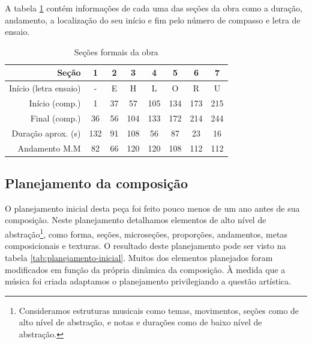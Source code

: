 A tabela \ref{tab:secoes-obra} contém informações de cada uma das
seções da obra como a duração, andamento, a localização do seu início
e fim pelo número de compasso e letra de ensaio.

\begin{table}
  \centering
  \begin{tabular}{r|ccccccc}
    Seção & 1 & 2 & 3 & 4 & 5 & 6 & 7 \\
    \hline
    Início (letra ensaio) & - & E & H & L & O & R & U \\
    Início (comp.) & 1 & 37 & 57 & 105 & 134 & 173 & 215 \\
    Final (comp.) & 36 & 56 & 104 & 133 & 172 & 214 & 244 \\
    Duração aprox. (s) & 132 & 91 & 108 & 56 & 87 & 23 & 16\\
    Andamento M.M & 82 & 66 & 120 & 120 & 108 & 112 & 112 \\
  \end{tabular}
  \caption{Seções formais da obra}
  \label{tab:secoes-obra}
\end{table}

\subsection{Planejamento da composição}
\label{sec:plan-da-comp}

O planejamento inicial desta peça foi feito pouco menos de um ano
antes de sua composição. Neste planejamento detalhamos elementos de
alto nível de abstração\footnote{Consideramos estruturas musicais como
  temas, movimentos, seções como de alto nível de abstração, e notas e
  durações como de baixo nível de abstração.}, como forma, seções,
microseções, proporções, andamentos, metas composicionais e
texturas. O resultado deste planejamento pode ser visto na tabela
\ref{tab:planejamento-inicial}. Muitos dos elementos planejados foram
modificados em função da própria dinâmica da composição. À medida que
a música foi criada adaptamos o planejamento privilegiando a questão
artística.

